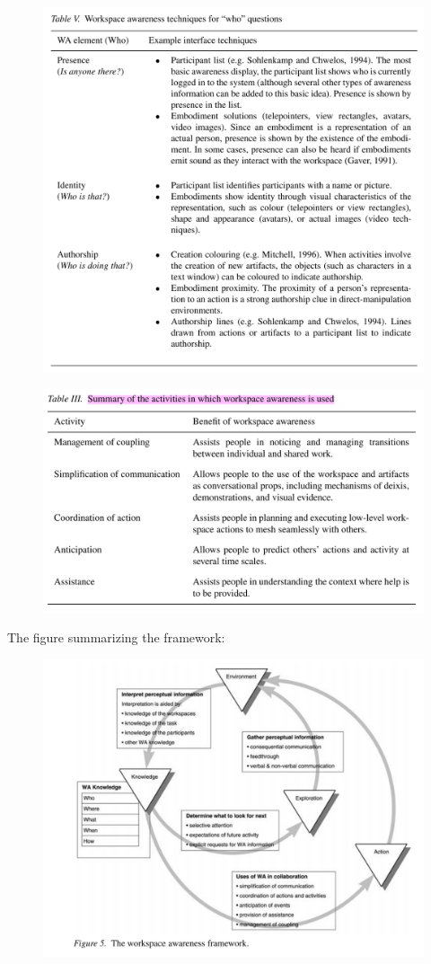 \begin{figure}
	\centering
	\includegraphics[width=0.7\linewidth]{figures/placeholders/WA_techniques_for_WHO_questions}
	\caption{}
	\label{fig:watechniquesforwhoquestions}
\end{figure}

\begin{figure}
	\centering
	\includegraphics[width=0.7\linewidth]{figures/placeholders/summary_of_activities_wher_WA_can_be_used}
	\caption{}
	\label{fig:summaryofactivitieswherwacanbeused}
\end{figure}


The figure summarizing the framework:

\begin{figure}
	\centering
	\includegraphics[width=0.7\linewidth]{figures/placeholders/WA_framework}
	\caption{}
	\label{fig:waframework}
\end{figure}


